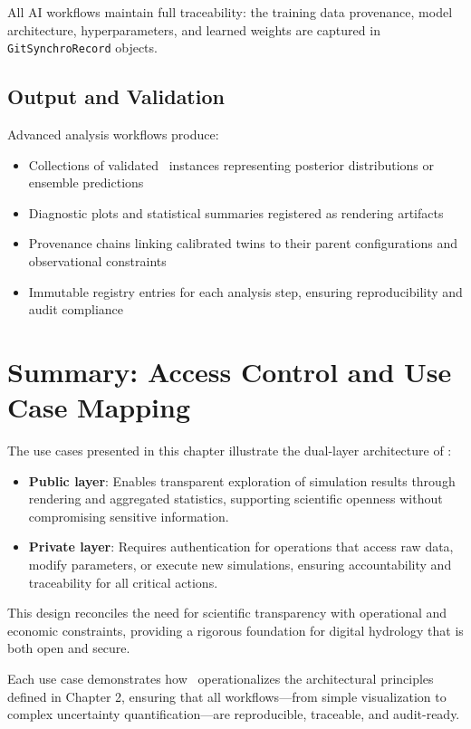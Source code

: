 All AI workflows maintain full traceability: the training data provenance, model architecture, hyperparameters, and learned weights are captured in \texttt{GitSynchroRecord} objects.

\subsection{Output and Validation}

Advanced analysis workflows produce:

\begin{itemize}
\item Collections of validated \hydrot\ instances representing posterior distributions or ensemble predictions
\item Diagnostic plots and statistical summaries registered as rendering artifacts
\item Provenance chains linking calibrated twins to their parent configurations and observational constraints
\item Immutable registry entries for each analysis step, ensuring reproducibility and audit compliance
\end{itemize}


\section{Summary: Access Control and Use Case Mapping}

The use cases presented in this chapter illustrate the dual-layer architecture of \hydrot:

\begin{itemize}
\item \textbf{Public layer}: Enables transparent exploration of simulation results through rendering and aggregated statistics, supporting scientific openness without compromising sensitive information.

\item \textbf{Private layer}: Requires authentication for operations that access raw data, modify parameters, or execute new simulations, ensuring accountability and traceability for all critical actions.
\end{itemize}

This design reconciles the need for scientific transparency with operational and economic constraints, providing a rigorous foundation for digital hydrology that is both open and secure.

Each use case demonstrates how \hydrot\ operationalizes the architectural principles defined in Chapter 2, ensuring that all workflows---from simple visualization to complex uncertainty quantification---are reproducible, traceable, and audit-ready.
